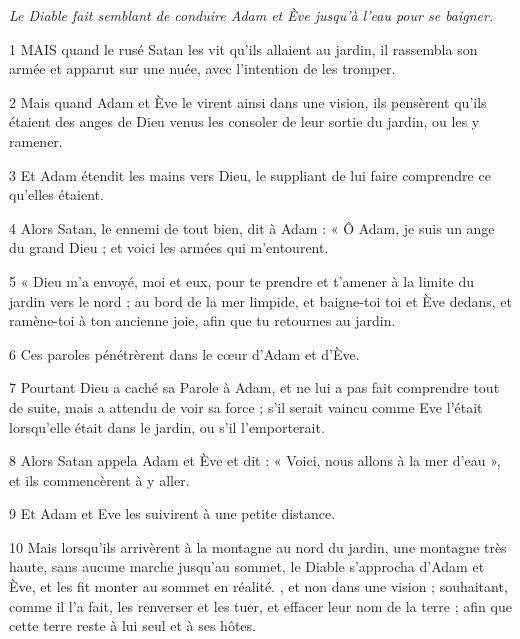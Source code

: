 \par \textit{Le Diable fait semblant de conduire Adam et Ève jusqu'à l'eau pour se baigner.}

\par 1 MAIS quand le rusé Satan les vit qu'ils allaient au jardin, il rassembla son armée et apparut sur une nuée, avec l'intention de les tromper.

\par 2 Mais quand Adam et Ève le virent ainsi dans une vision, ils pensèrent qu'ils étaient des anges de Dieu venus les consoler de leur sortie du jardin, ou les y ramener.

\par 3 Et Adam étendit les mains vers Dieu, le suppliant de lui faire comprendre ce qu'elles étaient.

\par 4 Alors Satan, le ennemi de tout bien, dit à Adam : « Ô Adam, je suis un ange du grand Dieu ; et voici les armées qui m’entourent.

\par 5 « Dieu m'a envoyé, moi et eux, pour te prendre et t'amener à la limite du jardin vers le nord ; au bord de la mer limpide, et baigne-toi toi et Ève dedans, et ramène-toi à ton ancienne joie, afin que tu retournes au jardin.

\par 6 Ces paroles pénétrèrent dans le cœur d'Adam et d'Ève.

\par 7 Pourtant Dieu a caché sa Parole à Adam, et ne lui a pas fait comprendre tout de suite, mais a attendu de voir sa force ; s'il serait vaincu comme Eve l'était lorsqu'elle était dans le jardin, ou s'il l'emporterait.

\par 8 Alors Satan appela Adam et Ève et dit : « Voici, nous allons à la mer d'eau », et ils commencèrent à y aller.

\par 9 Et Adam et Eve les suivirent à une petite distance.

\par 10 Mais lorsqu'ils arrivèrent à la montagne au nord du jardin, une montagne très haute, sans aucune marche jusqu'au sommet, le Diable s'approcha d'Adam et Ève, et les fit monter au sommet en réalité. , et non dans une vision ; souhaitant, comme il l'a fait, les renverser et les tuer, et effacer leur nom de la terre ; afin que cette terre reste à lui seul et à ses hôtes.



